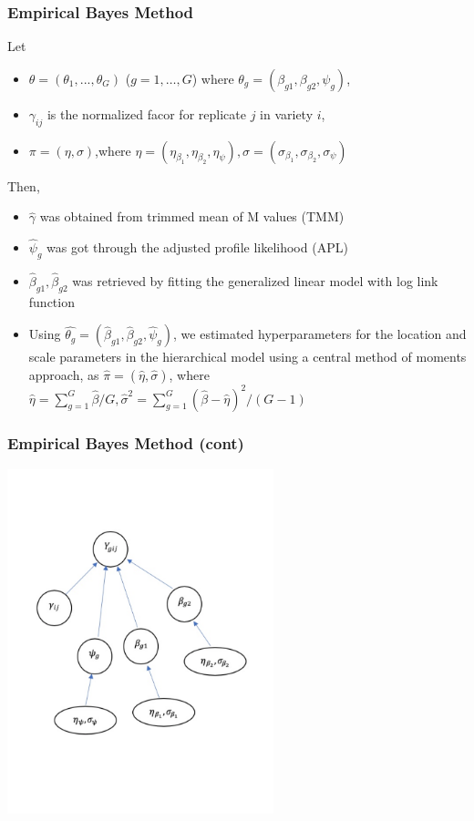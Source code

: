 \documentclass[handout,10pt]{beamer}
\begin{document}
\begin{frame}
\frametitle{Empirical Bayes Method}

Let 
\begin{itemize}
\item $\theta = (\theta_1, ..., \theta_G)$ ($g=1,\ldots,G$) where $\theta_g = (\beta_{g1}, \beta_{g2}, \psi_g)$, 
\item $\gamma_{ij}$ is the normalized facor for replicate $j$ in variety $i$, 
\item $\pi=(\eta, \sigma)$,where $\eta=(\eta_{\beta_1}, \eta_{\beta_2}, \eta_{\psi}), \sigma = (\sigma_{\beta_1}, \sigma_{\beta_2}, \sigma_\psi)$
\end{itemize}

Then,

\begin{itemize}
\item $\hat{\gamma}$ was obtained from trimmed mean of M values (TMM)
\item $\hat{\psi}_g$ was got through the adjusted profile likelihood (APL)
\item $\hat{\beta}_{g1}, \hat{\beta}_{g2}$ was retrieved by fitting the generalized linear model with log link function
\item Using $\hat{\theta_g} = (\hat{\beta}_{g1}, \hat{\beta}_{g2}, \hat{\psi}_g)$, we estimated hyperparameters for the location and scale parameters in the hierarchical model using a central method of moments approach, as $\hat{\pi} = (\hat{\eta}, \hat{\sigma})$, where $\hat{\eta} = \sum_{g=1}^G \hat{\beta}/G, \hat{\sigma}^2 = \sum_{g=1}^G (\hat{\beta}-\hat{\eta})^2/(G-1)$

\end{itemize}

\end{frame}


\begin{frame}
\frametitle{Empirical Bayes Method (cont)}
\begin{center}
\includegraphics[scale=1, height=10cm]{dag1c}
\end{center}

\end{frame}
\end{document}

